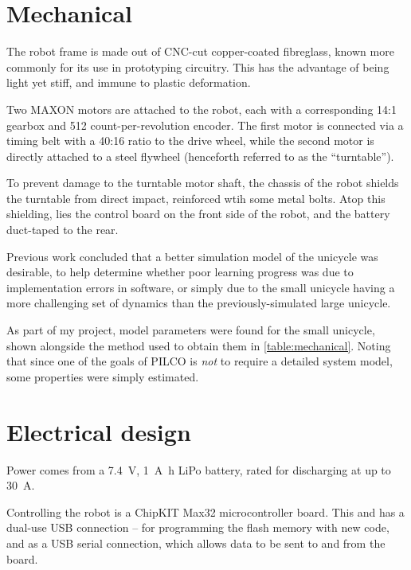 \documentclass[main.tex]{subfiles}
\begin{document}
\section{Mechanical}

	The robot frame is made out of CNC-cut copper-coated fibreglass, known more commonly for its use in prototyping circuitry.
	This has the advantage of being light yet stiff, and immune to plastic deformation.

	Two MAXON motors\cite{motor} are attached to the robot, each with a corresponding 14:1 gearbox\cite{gearbox} and 512 count-per-revolution encoder\cite{encoder}.
	The first motor is connected via a timing belt with a 40:16 ratio to the drive wheel, while the second motor is directly attached to a steel flywheel (henceforth referred to as the \enquote{turntable}).

	To prevent damage to the turntable motor shaft, the chassis of the robot shields the turntable from direct impact, reinforced wtih some metal bolts.
	Atop this shielding, lies the control board on the front side of the robot, and the battery duct-taped to the rear.

	Previous work concluded \cite[p.~54]{aleksi} that a better simulation model of the unicycle was desirable, to help determine whether poor learning progress was due to implementation errors in software, or simply due to the small unicycle having a more challenging set of dynamics than the previously-simulated large unicycle.

	As part of my project, model parameters were found for the small unicycle, shown alongside the method used to obtain them in \cref{table:mechanical}.
	Noting that since one of the goals of PILCO is \emph{not} to require a detailed system model, some properties were simply estimated.

	\begin{table}
		
		\label{table:mechanical}
	\end{table}


\section{Electrical design}

	Power comes from a \SI{7.4}{\volt}, \SI{1}{\ampere\hour}  LiPo battery, rated for discharging at up to \SI{30}{\ampere}.

	Controlling the robot is a ChipKIT Max32 microcontroller board. This and has a dual-use USB connection -- for programming the flash memory with new code, and as a USB serial connection, which allows data to be sent to and from the board.
\end{document}
